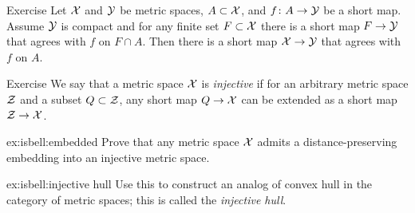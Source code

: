\begin{thm}{Exercise}\label{ex:petrunin-stadler}
Let $\mathcal{X}$ and $\mathcal{Y}$ be metric spaces, $A\subset \spc{X}$, and $f\:A\to \spc{Y}$ be a short map.
Assume $\mathcal{Y}$ is compact and for any finite set $F\subset \spc{X}$ there is a short map $F\to \spc{Y}$ that agrees with $f$ on $F\cap A$.
Then there is a short map $\spc{X}\to \spc{Y}$ that agrees with $f$ on $A$.
\end{thm}

\begin{thm}{Exercise}\label{ex:isbell}
We say that a metric space $\mathcal{X}$ is \emph{injective} 
if for an arbitrary metric space $\mathcal{Z}$ 
and a subset $Q\subset\spc Z$, 
any short map $Q\to\spc{X}$ can be extended as a short map $\spc{Z}\to\spc{X}$.
\begin{subthm}{ex:isbell:embedded}
Prove that any metric space $\mathcal{X}$ admits a distance-preserving embedding into an injective metric space.
\end{subthm}

\begin{subthm}{ex:isbell:injective hull}
Use this to construct an analog of convex hull in the category of metric spaces; this is called the \emph{injective hull}.
\end{subthm}
\end{thm}



